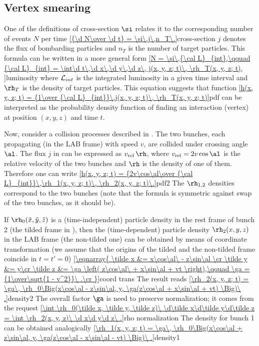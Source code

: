 \subsection{Vertex smearing}

One of the definitions of cross-section $\si$ relates it to the corresponding number of events $N$ per time
\eqref{{\d N\over \d t} = \si\,j\,n_T\.}{cross-section}
$j$ denotes the flux of bombarding particles and $n_T$ is the number of target particles. This formula can be written in a more general form
\eqref{N = \si\,{\cal L}_{int},\qquad {\cal L}_{int} = \int\d t\,\d x\,\d y\,\d z\, j(x, y, z; t)\, \rh_T(x, y, z; t), }{luminosity}
where ${\cal L}_{int}$ is the integrated luminosity in a given time interval and $\rh_T$ is the density of target particles. This equation suggests that function
\eqref{h(x, y, z; t) = {1\over {\cal L}_{int}}\,j(x, y, z; t)\, \rh_T(x, y, z; t)}{pdf}
can be interpreted as the probability density function of finding an interaction (vertex) at position $(x, y, z)$ and time $t$.


Now, consider a collision processes described in . The two bunches, each propagating (in the LAB frame) with speed $v$, are collided under crossing angle $\al$. The flux $j$ in  can be expressed as $v_{\rm rel}\,\rh$, where $v_{\rm rel} = 2v\cos\al$ is the relative velocity of the two bunches and $\rh$ is the density of one of them. Therefore one can write
\eqref{h(x, y, z; t) = {2v\cos\al\over {\cal L}_{int}}\,\rh_1(x, y, z; t)\, \rh_2(x, y, z; t)\.}{pdf2}
The $\rh_{1,2}$ densities correspond to the two bunches (note that the formula is symmetric against swap of the two bunches, as it should be).

If $\rh_0(\tilde x, \tilde y, \tilde z)$ is a (time-independent) particle density in the rest frame of bunch 2 (the tilded frame in ), then the (time-dependent) particle density $\rh_2(x, y, z)$ in the LAB frame (the non-tilded one) can be obtained by means of coordinate transformation (we assume that the origins of the tilded and the non-tilded frame coincide in $t=t'=0$)
\eqref{\eqnarray{
\tilde x &= x\cos\al\ - z\sin\al \cr
\tilde y &= y\cr
\tilde z &= \ga \left( z\cos\al\ + x\sin\al + vt \right),\qquad \ga = {1\over\sqrt{1 - v^2}}\ .\cr
}}{coord trans}
The result reads
\eqref{\rh_2(x, y, z; t) = \ga\, \rh_0\Big(x\cos\al - z\sin\al, y, \ga(z\cos\al + x\sin\al + vt) \Big)\ .}{density2}
The overall factor $\ga$ is need to preserve normalization; it comes from the request
\eqref{\int \rh_0(\tilde x, \tilde y, \tilde z)\ \d\tilde x\d\tilde y\d\tilde z = \int \rh_2(x, y, z)\ \d x\d y\d z\ .}{rho normalization}
The density for bunch 1 can be obtained analogically
\eqref{\rh_1(x, y, z; t) = \ga\, \rh_0\Big(x\cos\al + z\sin\al, y, \ga(z\cos\al - x\sin\al - vt) \Big)\ .}{density1}

